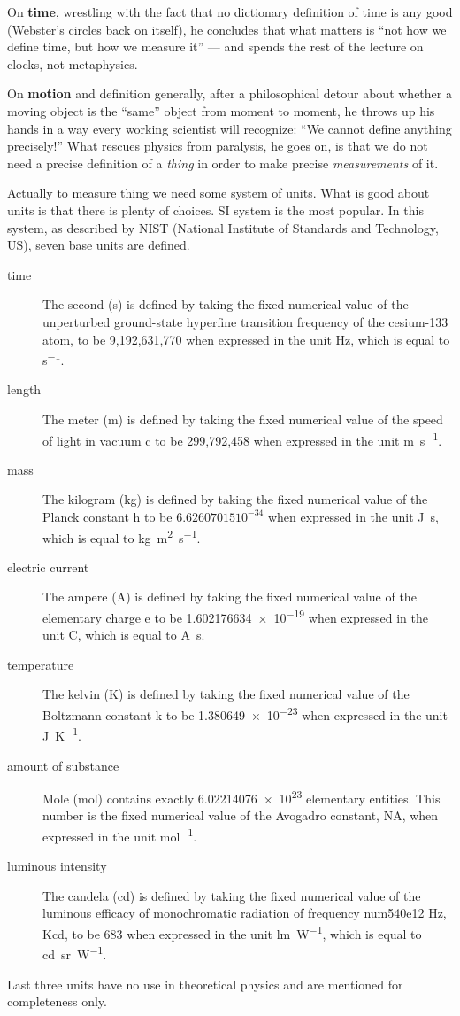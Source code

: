 On \textbf{time}, wrestling with the fact that no dictionary definition of time
is any good (Webster's circles back on itself), he concludes that what matters
is ``not how we define time, but how we measure it'' --- and spends the rest of
the lecture on clocks, not metaphysics.

On \textbf{motion} and definition generally, after a philosophical detour about
whether a moving object is the ``same'' object from moment to moment, he throws
up his hands in a way every working scientist will recognize: ``We cannot
define anything precisely!'' What rescues physics from paralysis, he goes on,
is that we do not need a precise definition of a \emph{thing} in order to make
precise \emph{measurements} of it.

Actually to measure thing we need some
system of units. What is good about units is that there is plenty of choices.
SI system is the most popular. In this system, as described by NIST (National
Institute of Standards and Technology, US), seven base units are defined.
\begin{description}
    \item [time] 
        The second (s) is defined by taking the fixed numerical value of the
        unperturbed ground-state hyperfine transition frequency of the
        cesium-133 atom, to be 9,192,631,770 when expressed in the unit Hz,
        which is equal to \unit{ s^{-1}}.
    \item [length] 
        The meter (m) is defined by taking the fixed numerical value of the
        speed of light in vacuum c to be 299,792,458 when expressed in the unit
        \unit{m.s^{-1}}.
    \item [mass] 
    The kilogram (kg) is defined by taking the fixed numerical value of the
        Planck constant h to be $6.62607015 10^{-34}$ when expressed in the
        unit \unit{J.s}, which is equal to \unit{kg.m^2.s^{-1}}.
    \item [electric current] 
    The ampere (A) is defined by taking the fixed numerical value of the
        elementary charge e to be \num{1.602176634e-19} when expressed in the
        unit C, which is equal to \unit{A.s}.
    \item [temperature] 
    The kelvin (K) is defined by taking the fixed numerical value of the
        Boltzmann constant k to be \num{1.380 649e-23} when expressed in the
        unit \unit{J.K^{-1}}.
    \item [amount of substance] 
    Mole (mol) contains exactly \num{6.02214076e23} elementary entities. This
        number is the fixed numerical value of the Avogadro constant, NA, when
        expressed in the unit \unit{mol^{-1}}.
    \item [luminous intensity] 
    The candela (cd) is defined by taking the fixed numerical value of the
        luminous efficacy of monochromatic radiation of frequency num{540e12}
        Hz, Kcd, to be 683 when expressed in the unit \unit{lm.W^{-1}}, which
        is equal to \unit{cd.sr.W^{-1}}.
\end{description}
Last three units have no use in theoretical physics and are mentioned for 
completeness only.

